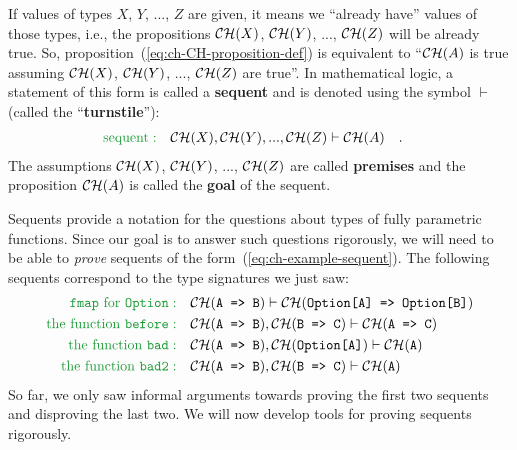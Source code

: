 If values of types $X$, $Y$, ..., $Z$ are given, it means we \textsf{``}already
have\textsf{''} values of those types, i.e., the propositions ${\cal CH}(X)$,
${\cal CH}(Y)$, ..., ${\cal CH}(Z)$ will be already true. So, proposition~(\ref{eq:ch-CH-proposition-def})
is equivalent to \textsf{``}${\cal CH}(A)$ is true assuming ${\cal CH}(X)$,
${\cal CH}(Y)$, ..., ${\cal CH}(Z)$ are true\textsf{''}. In mathematical
logic, a statement of this form is called a \textbf{sequent} and
is denoted using the symbol $\vdash$ (called the \textsf{``}\textbf{turnstile}\textsf{''}):
\begin{align}
{\color{greenunder}\text{sequent}:}\quad & {\cal CH}(X),{\cal CH}(Y),...,{\cal CH}(Z)\vdash{\cal CH}(A)\quad.\label{eq:ch-example-sequent}
\end{align}
The assumptions ${\cal CH}(X)$, ${\cal CH}(Y)$, ..., ${\cal CH}(Z)$
are called \textbf{premises} and
the proposition ${\cal CH}(A)$ is called the \textbf{goal}
of the sequent.

Sequents provide a notation for the questions about types of fully
parametric functions. Since our goal is to answer such questions rigorously,
we will need to be able to \emph{prove} sequents of the form~(\ref{eq:ch-example-sequent}).
The following sequents correspond to the type signatures we just saw:
\begin{align*}
{\color{greenunder}\text{\texttt{fmap} for \texttt{Option}}:}\quad & {\cal CH}(\text{\texttt{A => B}})\vdash{\cal CH}(\text{\texttt{Option[A] => Option[B]}})\\
{\color{greenunder}\text{the function \texttt{before}}:}\quad & {\cal CH}(\text{\texttt{A => B}}),{\cal CH}(\text{\texttt{B => C}})\vdash{\cal CH}(\text{\texttt{A => C}})\\
{\color{greenunder}\text{the function }\text{\texttt{bad}}:}\quad & {\cal CH}(\text{\texttt{A => B}}),{\cal CH}(\text{\texttt{Option[A]}})\vdash{\cal CH}(\text{\texttt{A}})\\
{\color{greenunder}\text{the function }\text{\texttt{bad2}}:}\quad & {\cal CH}(\text{\texttt{A => B}}),{\cal CH}(\text{\texttt{B => C}})\vdash{\cal CH}(\text{\texttt{A}})
\end{align*}
So far, we only saw informal arguments towards proving the first two
sequents and disproving the last two. We will now develop tools for
proving sequents rigorously. 

